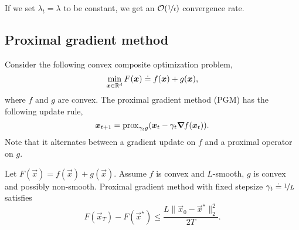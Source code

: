 If we set $\lambda_t = \lambda$ to be constant, we get an $\bigo{\nicefrac{1}{t}}$ convergence
rate.

\subsection{Proximal gradient method}

Consider the following convex composite optimization problem, \[
    \min_{\bm{x} \in \mathbb{R}^d} F(\bm{x}) \doteq f(\bm{x}) + g(\bm{x}),
\]
where $f$ and $g$ are convex. The proximal
gradient method (PGM) has the following update rule, \[
    \bm{x}_{t+1} = \mathrm{prox}_{\gamma_t g}(\bm{x}_t - \gamma_t \bm{\nabla}_{\! } f(\bm{x}_t)).
\]
Note that it alternates between a gradient update on $f$ and a proximal operator on $g$.

\begin{theorem}
    Let $F(\vec{x}) = f(\vec{x}) + g(\vec{x})$. Assume $f$ is convex and $L$-smooth, $g$ is convex
    and possibly non-smooth. Proximal gradient method with fixed stepsize $\gamma_t \doteq \nicefrac{1}{L}$
    satisfies \[
        F(\vec{x}_T) - F(\vec{x}^\star) \leq \frac{L \| \vec{x}_0 - \vec{x}^\star \|_2^2}{2T}.
    \]
\end{theorem}


